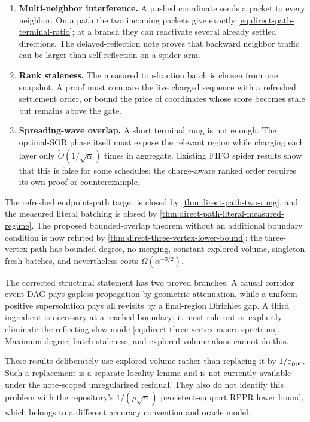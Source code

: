 \begin{enumerate}[leftmargin=*]
 \item \textbf{Multi-neighbor interference.} A pushed coordinate sends a
 packet to every neighbor. On a path the two incoming packets give exactly
 \cref{eq:direct-path-terminal-ratio}; at a branch they can reactivate
 several already settled directions. The delayed-reflection note proves
 that backward neighbor traffic can be larger than self-reflection on a
 spider arm.
 \item \textbf{Rank staleness.} The measured top-fraction batch is chosen
 from one snapshot. A proof must compare the live charged sequence with a
 refreshed settlement order, or bound the price of coordinates whose score
 becomes stale but remains above the gate.
 \item \textbf{Spreading-wave overlap.} A short terminal rung is not enough.
 The optimal-SOR phase itself must expose the relevant region while charging
 each layer only $\widetilde O(1/\sqrt\alpha)$ times in aggregate. Existing
 FIFO spider results show that this is false for some schedules; the
 charge-aware ranked order requires its own proof or counterexample.
\end{enumerate}

The refreshed endpoint-path target is closed by
\cref{thm:direct-path-two-rung}, and the measured literal batching is closed
by \cref{thm:direct-path-literal-measured-regime}.  The proposed
bounded-overlap theorem without an additional boundary condition is now
refuted by \cref{thm:direct-three-vertex-lower-bound}: the three-vertex path
has bounded degree, no merging, constant explored volume, singleton fresh
batches, and nevertheless costs $\Omega(\alpha^{-3/2})$.

The corrected structural statement has two proved branches.  A causal
corridor event DAG pays gapless propagation by geometric attenuation, while a
uniform positive supersolution pays all revisits by a final-region Dirichlet
gap.  A third ingredient is necessary at a reached boundary: it must rule out
or explicitly eliminate the reflecting slow mode
\cref{eq:direct-three-vertex-macro-spectrum}.  Maximum degree, batch
staleness, and explored volume alone cannot do this.

These results deliberately use explored volume rather than replacing it by
$1/\varepsilon_{\mathrm{ppr}}$. Such a replacement is a separate locality lemma and is not
currently available under the note-scoped unregularized residual. They also
do not identify this problem with the repository's
$1/(\rho\sqrt\alpha)$ persistent-support RPPR lower bound, which belongs to a
different accuracy convention and oracle model.
